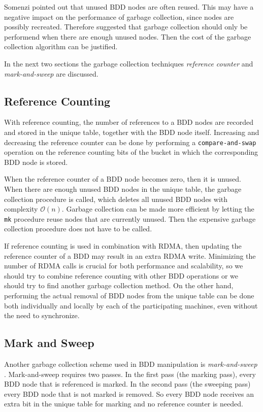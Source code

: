 Somenzi \cite{somenzi2001efficient} pointed out that unused BDD nodes are often reused. This may have a negative impact on the performance of garbage collection, since nodes are possibly recreated. Therefore \cite{somenzi2001efficient} suggested that garbage collection should only be performend when there are enough unused nodes. Then the cost of the garbage collection algorithm can be justified.

In the next two sections the garbage collection techniques \emph{reference counter} and \emph{mark-and-sweep} are discussed.

\subsection{Reference Counting}
With reference counting, the number of references to a BDD nodes are recorded and stored in the unique table, together with the BDD node itself. Increasing and decreasing the reference counter can be done by performing a \texttt{compare-and-swap} operation on the reference counting bits of the bucket in which the corresponding BDD node is stored. 

When the reference counter of a BDD node becomes zero, then it is unused. When there are enough unused BDD nodes in the unique table, the garbage collection procedure is called, which deletes all unused BDD nodes with complexity $\mathcal{O}(n)$. Garbage collection can be made more efficient by letting the \texttt{mk} procedure reuse nodes that are currently unused. Then the expensive garbage collection procedure does not have to be called.

If reference counting is used in combination with RDMA, then updating the reference counter of a BDD may result in an extra RDMA write. Minimizing the number of RDMA calls is crucial for both performance and scalability, so we should try to combine reference counting with other BDD operations or we should try to find another garbage collection method. On the other hand, performing the actual removal of BDD nodes from the unique table can be done both individually and locally by each of the participating machines, even without the need to synchronize. 

\subsection{Mark and Sweep}
Another garbage collection scheme used in BDD manipulation is \emph{mark-and-sweep} \cite{mccarthy1960recursive}. Mark-and-sweep requires two passes. In the first pass (the marking pass), every BDD node that is referenced is marked. In the second pass (the sweeping pass) every BDD node that is not marked is removed. So every BDD node receives an extra bit in the unique table for marking and no reference counter is needed.


